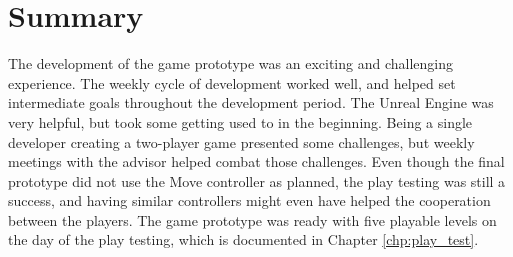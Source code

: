 \section{Summary}
The development of the game prototype was an exciting and challenging experience. The weekly cycle of development worked well, and helped set intermediate goals throughout the development period. The Unreal Engine was very helpful, but took some getting used to in the beginning. Being a single developer creating a two-player game presented some challenges, but weekly meetings with the advisor helped combat those challenges. Even though the final prototype did not use the Move controller as planned, the play testing was still a success, and having similar controllers might even have helped the cooperation between the players. The game prototype was ready with five playable levels on the day of the play testing, which is documented in Chapter \ref{chp:play_test}.
